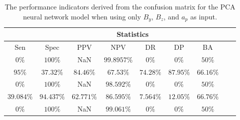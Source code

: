 \begin{table}[!ht]
	\centering
	\begin{tabular}{|c|c|c|c|c|c|c|c|c|}
		\hline
		 & \multicolumn{7}{c|}{Statistics} \\ \hline
		Sen & Spec & PPV & NPV & DR & DP & BA \\ \hline
		$0\%$ & $100\%$ & NaN & $99.8957\%$ & $0\%$ & $0\%$ & $50\%$ \\ \hline
		$95\%$ & $37.32\%$ & $84.46\%$ & $67.53\%$ & $74.28\%$ & $87.95\%$ & $66.16\%$ \\ \hline
		$0\%$ & $100\%$ & NaN & $98.592\%$ & $0\%$ & $0\%$ & $50\%$ \\ \hline
		$39.084\%$ & $94.437\%$ & $62.771\%$ & $86.595\%$ & $7.564\%$ & $12.05\%$ & $66.76\%$ \\ \hline
		$0\%$ & $100\%$ & NaN & $99.061\%$ & $0\%$ & $0\%$ & $50\%$ \\ \hline
	\end{tabular}
	\caption{The performance indicators derived from the confusion matrix for the PCA neural network model when using only $B_{y}$, $B_{z}$, and $a_{p}$ as input.}
	\label{tab:cs:yzap:pcaNNet}
\end{table}

